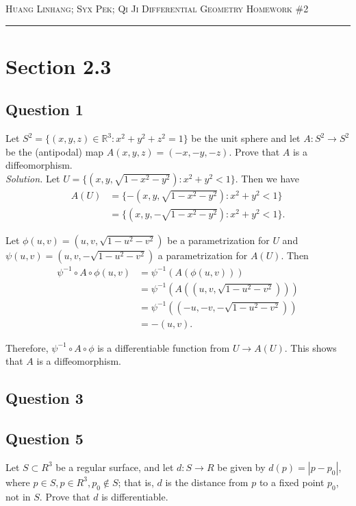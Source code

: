 \documentclass[12pt]{article}
\begin{document}
\thispagestyle{empty}

{\scshape Huang Linhang; Syx Pek; Qi Ji} \hfill {\scshape \large Differential Geometry} \hfill {\scshape Homework \#2}
 
\smallskip
\hrule
\bigskip

\section{Section 2.3}

\subsection*{Question 1}
Let $S^2 = \{(x,y,z) \in \mathbb{R}^3:x^2+y^2+z^2= 1\}$ be the unit sphere and let $A:S^2 \to S^2$ be the (antipodal) map $A(x,y, z) = (-x, -y, -z)$. Prove that $A$ is a diffeomorphism.\\

\textit{Solution.}
Let $U = \{(x,y,\sqrt{1-x^2-y^2}):x^2+y^2<1\}$. Then we have \begin{align*}
    A(U) &=\{-(x,y,\sqrt{1-x^2-y^2}):x^2+y^2<1\}\\
    &=\{(x,y,-\sqrt{1-x^2-y^2}):x^2+y^2<1\}.
\end{align*}

Let $\phi(u,v) = (u,v,\sqrt{1-u^2-v^2})$ be a parametrization for $U$ and $\psi(u,v) = (u,v,-\sqrt{1-u^2-v^2})$ a parametrization for $A(U)$. Then \begin{align*}
    \psi^{-1}\circ A\circ\phi(u,v) &= \psi^{-1}(A(\phi(u,v)))\\
    &= \psi^{-1}(A((u,v,\sqrt{1-u^2-v^2})))\\
    &= \psi^{-1}((-u,-v,-\sqrt{1-u^2-v^2}))\\
    &= -(u,v).
\end{align*}

Therefore, $\psi^{-1}\circ A\circ\phi$ is a differentiable function from $U\to A(U)$. This shows that $A$ is a diffeomorphism.

\subsection*{Question 3}

\subsection*{Question 5}
Let $S \subset R^3$ be a regular surface, and let $d:S\to R$ be given by $d(p)=|p- p_0|$, where $p \in S, p \in R^3, p_0 \notin S$; that is, $d$ is the distance from $p$ to a fixed point $p_0$, not in $S$. Prove that $d$ is differentiable.\\
\end{document}
